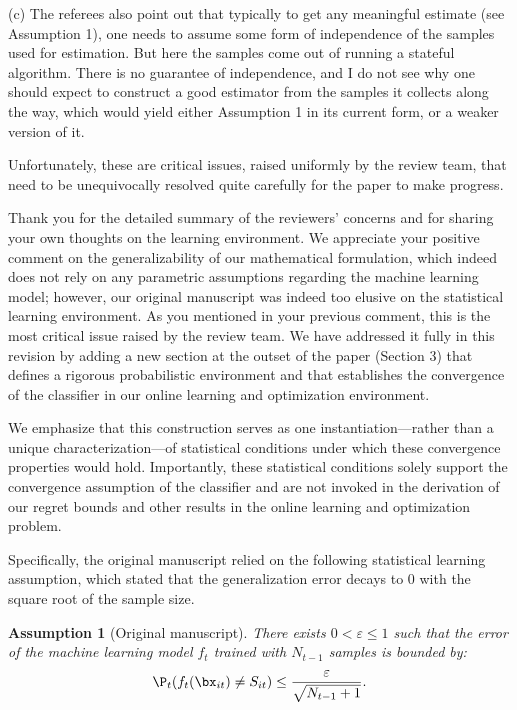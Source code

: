 \documentclass[11pt]{article}
\newtheorem{assumption}{Assumption}[]
\begin{document}
\begin{commentBox}
(c) The referees also point out that typically to get any meaningful estimate (see Assumption 1), one needs to assume some form of independence of the samples used for estimation. But here the samples come out of running a stateful algorithm. There is no guarantee of independence, and I do not see why one should expect to construct a good estimator from the samples it collects along the way, which would yield either Assumption 1 in its current form, or a weaker version of it.

Unfortunately, these are critical issues, raised uniformly by the review team, that need to be unequivocally resolved quite carefully for the paper to make progress.
\end{commentBox}

Thank you for the detailed summary of the reviewers' concerns and for sharing your own thoughts on the learning environment. We appreciate your positive comment on the generalizability of our mathematical formulation, which indeed does not rely on any parametric assumptions regarding the machine learning model; however, our original manuscript was indeed too elusive on the statistical learning environment. As you mentioned in your previous comment, this is the most critical issue raised by the review team. We have addressed it fully in this revision by adding a new section at the outset of the paper (Section 3) that defines a rigorous probabilistic environment and that establishes the convergence of the classifier in our online learning and optimization environment.

We emphasize that this construction serves as one instantiation—rather than a unique characterization—of statistical conditions under which these convergence properties would hold. Importantly, these statistical conditions solely support the convergence assumption of the classifier and are not invoked in the derivation of our regret bounds and other results in the online learning and optimization problem.

Specifically, the original manuscript relied on the following statistical learning assumption, which stated that the generalization error decays to 0 with the square root of the sample size.
\setcounter{assumption}{0}
\begin{assumption}[Original manuscript] \label{ass:classification_old_AE}
    There exists $0<\varepsilon\leq 1$ such that the error of the machine learning model $f_t$ trained with $N_{t-1}$ samples is bounded by:
    \begin{align*}
         \P_{t}(f_t(\bx_{it})\neq S_{it})\leq \frac{\varepsilon }{\sqrt{N_{t-1} + 1}}.
    \end{align*}
\end{assumption}
\end{document}
